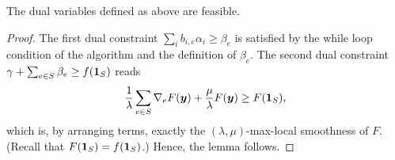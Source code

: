 \begin{lemma}
The dual variables defined as above are feasible. 
\end{lemma}
%
\begin{proof}
The first dual constraint $\sum_{i} b_{i,e} \alpha_{i} \geq \beta_{e}$ is satisfied by the while loop condition of the algorithm
and the definition of $\beta_{e}$.
The second dual constraint $\gamma + \sum_{e \in S} \beta_{e} \geq f(\bm{1}_{S})$ reads
\begin{align*}
	\frac{1}{\lambda} \sum_{e \in S} \nabla_{e} F(\bm{y}) + \frac{\mu}{\lambda} F(\bm{y}) \geq F(\bm{1}_{S}), 
\end{align*}
which is, by arranging terms, exactly the $(\lambda, \mu)$-max-local smoothness of $F$. 
(Recall that $F(\bm{1}_{S}) = f(\bm{1}_{S})$.)
Hence, the lemma follows.
\end{proof}



